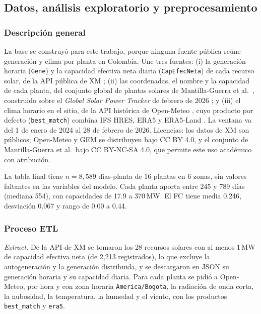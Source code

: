 \documentclass[pdflatex,sn-mathphys-num]{sn-jnl}
\begin{document}

\subsection{Datos, análisis exploratorio y preprocesamiento}\label{subsec:datos}

\subsubsection{Descripción general}

La base se construyó para este trabajo, porque ninguna fuente pública reúne generación y clima por planta en Colombia. Une tres fuentes: (i) la generación horaria (\texttt{Gene}) y la capacidad efectiva neta diaria (\texttt{CapEfecNeta}) de cada recurso solar, de la API pública de XM \cite{xm_api}; (ii) las coordenadas, el nombre y la capacidad de cada planta, del conjunto global de plantas solares de Mantilla-Guerra et al.\ \cite{mantillaguerra2026}, construido sobre el \emph{Global Solar Power Tracker} de febrero de 2026 \cite{gem2026solar}; y (iii) el clima horario en el sitio, de la API histórica de Open-Meteo \cite{zippenfenig2023openmeteo}, cuyo producto por defecto (\texttt{best\_match}) combina IFS HRES, ERA5 y ERA5-Land \cite{hersbach2020era5,munozsabater2021era5land}. La ventana va del 1 de enero de 2024 al 28 de febrero de 2026. Licencias: los datos de XM son públicos; Open-Meteo y GEM se distribuyen bajo CC BY 4.0, y el conjunto de Mantilla-Guerra et al.\ bajo CC BY-NC-SA 4.0, que permite este uso académico con atribución.

La tabla final tiene $n = 8{,}589$ días-planta de 16 plantas en 6 zonas, sin valores faltantes en las variables del modelo. Cada planta aporta entre 245 y 789 días (mediana 554), con capacidades de 17.9 a 370\,MW. El FC tiene media 0.246, desviación 0.067 y rango de 0.00 a 0.44.

\subsubsection{Proceso ETL}

\textit{Extract.} De la API de XM se tomaron los 28 recursos solares con al menos 1\,MW de capacidad efectiva neta (de 2{,}213 registrados), lo que excluye la autogeneración y la generación distribuida, y se descargaron en JSON su generación horaria y su capacidad diaria. Para cada planta se pidió a Open-Meteo, por hora y con zona horaria \texttt{America/Bogota}, la radiación de onda corta, la nubosidad, la temperatura, la humedad y el viento, con los productos \texttt{best\_match} y \texttt{era5}.
\end{document}
